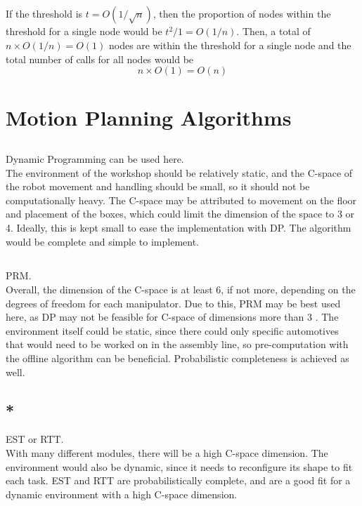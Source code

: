 \subsection{}
If the threshold is $t=O(1/\sqrt{n})$, then the proportion of nodes
within the threshold for a single node would be $t^2/1=O(1/n)$. 
Then, a total of $n\times O(1/n)=O(1)$ nodes are within the threshold 
for a single node and the total number of calls for all nodes would be 
\[n\times O(1)=O(n)\]



\newpage
\section{Motion Planning Algorithms}
\subsection{}
Dynamic Programming can be used here.\\
The environment of the workshop should be relatively static,
and the C-space of the robot movement and handling should be small,
so it should not be computationally heavy.
The C-space may be attributed to movement on the floor
and placement of the boxes,
which could limit the dimension of the space to 3 or 4.
Ideally, this is kept small to ease the implementation with DP.
The algorithm would be complete and simple to implement.

\subsection{}
PRM.\\ Overall, the dimension of the C-space is at least 6, if not more,
depending on the degrees of freedom for each manipulator.
Due to this, PRM may be best used here, as DP may not be feasible
for C-space of dimensions more than 3 \cite{cho05}.
The environment itself could be static, since there could only
specific automotives that would need to be worked on in the assembly line,
so pre-computation with the offline algorithm can be beneficial.
Probabilistic completeness is achieved as well.

\subsection{*}
EST or RTT.\\
With many different modules, there will be a high C-space dimension.
The environment would also be dynamic, since it needs to reconfigure
its shape to fit each task.
EST and RTT are probabilistically complete, and are a good fit
for a dynamic environment with a high C-space dimension.

